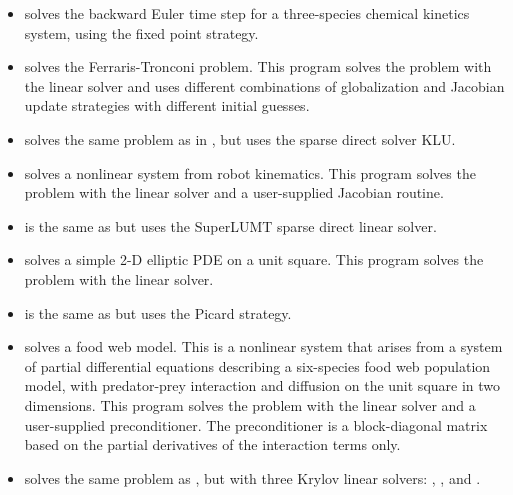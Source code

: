 \begin{itemize}
\item {}
  solves the backward Euler time step for a three-species chemical kinetics
  system, using the fixed point strategy.

\item {}
  solves the Ferraris-Tronconi problem.
  \newline
  This program solves the problem with the {\kindense} linear solver
  and uses different combinations of globalization and Jacobian
  update strategies with different initial guesses.
\item {}
  solves the same problem as in , but uses the
  sparse direct solver KLU.

\item {}
  solves a nonlinear system from robot kinematics.
  \newline
  This program solves the problem with the {\kindense} linear solver
  and a user-supplied Jacobian routine.
\item {}
  is the same as  but uses the SuperLUMT sparse direct
  linear solver.

\item {}
  solves a simple 2-D elliptic PDE on a unit square.
 \newline
  This program solves the problem with the {\kinband} linear solver.
\item {}
  is the same as  but uses the Picard strategy.

\item {}
  solves a food web model.
  \newline
  This is a nonlinear system that arises from a system of partial
  differential equations describing a six-species food web population
  model, with predator-prey interaction and diffusion on the unit
  square in two dimensions.
  This program solves the problem with the {\kinspgmr} linear solver
  and a user-supplied preconditioner. The preconditioner is a
  block-diagonal matrix based on the partial derivatives of the
  interaction terms only.
\item {}
  solves the same problem as , but with three Krylov
  linear solvers: , , and .
\end{itemize}

